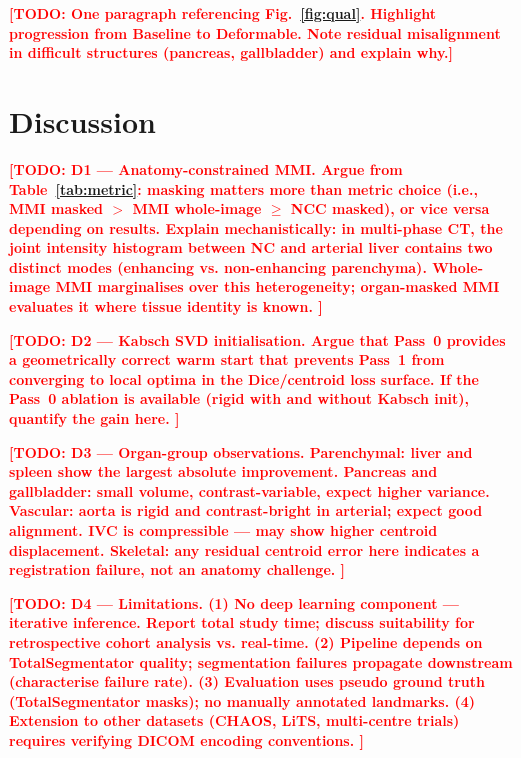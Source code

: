 \documentclass[10pt,twocolumn]{article}
\newcommand{\TODO}[1]{\textcolor{red}{\textbf{[TODO: #1]}}}
\begin{document}
\TODO{One paragraph referencing Fig.~\ref{fig:qual}. Highlight
progression from Baseline to Deformable. Note residual misalignment
in difficult structures (pancreas, gallbladder) and explain why.}

\section{Discussion}
\label{sec:discussion}

\TODO{%
  D1 — Anatomy-constrained MMI.
  Argue from Table~\ref{tab:metric}: masking matters more than metric
  choice (i.e., MMI masked $>$ MMI whole-image $\geq$ NCC masked),
  or vice versa depending on results. Explain mechanistically:
  in multi-phase CT, the joint intensity histogram between NC and
  arterial liver contains two distinct modes (enhancing vs.
  non-enhancing parenchyma). Whole-image MMI marginalises over this
  heterogeneity; organ-masked MMI evaluates it where tissue identity
  is known.
}

\TODO{%
  D2 — Kabsch SVD initialisation.
  Argue that Pass~0 provides a geometrically correct warm start that
  prevents Pass~1 from converging to local optima in the Dice/centroid
  loss surface. If the Pass~0 ablation is available (rigid with and
  without Kabsch init), quantify the gain here.
}

\TODO{%
  D3 — Organ-group observations.
  Parenchymal: liver and spleen show the largest absolute improvement.
  Pancreas and gallbladder: small volume, contrast-variable, expect
  higher variance.
  Vascular: aorta is rigid and contrast-bright in arterial; expect
  good alignment. IVC is compressible — may show higher centroid
  displacement.
  Skeletal: any residual centroid error here indicates a registration
  failure, not an anatomy challenge.
}

\TODO{%
  D4 — Limitations.
  (1) No deep learning component — iterative inference.
  Report total study time; discuss suitability for retrospective
  cohort analysis vs. real-time.
  (2) Pipeline depends on TotalSegmentator quality; segmentation
  failures propagate downstream (characterise failure rate).
  (3) Evaluation uses pseudo ground truth (TotalSegmentator masks);
  no manually annotated landmarks.
  (4) Extension to other datasets (CHAOS, LiTS, multi-centre trials)
  requires verifying DICOM encoding conventions.
}

\end{document}
